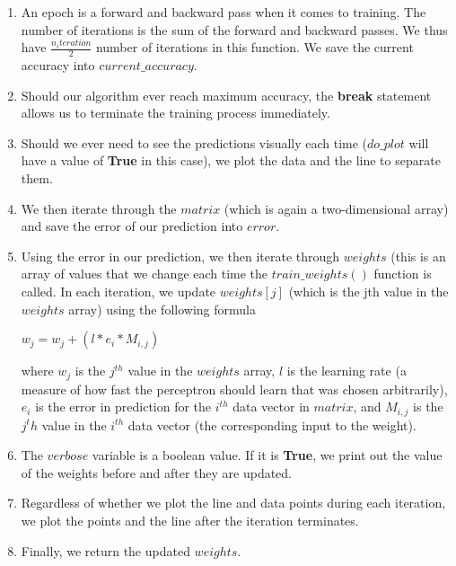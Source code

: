 	\begin{enumerate}
		\item An epoch is a forward and backward pass when it comes to training. The number of iterations is the sum of the forward and backward passes. We thus have $\frac{n_iteration }{2}$ number of iterations in this function. We save the current accuracy into $current\_accuracy$. 
		
		\item Should our algorithm ever reach maximum accuracy, the \textbf{break} statement allows us to terminate the training process immediately. 
		
		\item Should we ever need to see the predictions visually each time ($do\_plot$ will have a value of \textbf{True} in this case), we plot the data and the line to separate them. 
		
		\item We then iterate through the $matrix$ (which is again a two-dimensional array) and save the error of our prediction into $error$.
		
		\item Using the error in our prediction, we then iterate through $weights$ (this is an array of values that we change each time the $train\_weights()$ function is called. In each iteration, we update $weights[j]$ (which is the jth value in the $weights$ array) using the following formula \\
		\begin{center}
			$w_j = w_j + (l * e_i * M_{i, j})$
		\end{center}
		
		where $w_j$ is the $j^{th}$ value in the $weights$ array, $l$ is the learning rate (a measure of how fast the perceptron should learn that was chosen arbitrarily), $e_i$ is the error in prediction for the $i^{th}$ data vector in $matrix$, and $M_{i, j}$ is the $j^th$ value in the $i^{th}$ data vector (the corresponding input to the weight).
		
		\item The $verbose$ variable is a boolean value. If it is \textbf{True}, we print out the value of the weights before and after they are updated. 
		
		\item Regardless of whether we plot the line and data points during each iteration, we plot the points and the line after the iteration terminates. 
		
		\item Finally, we return the updated $weights$.
	\end{enumerate}
	
